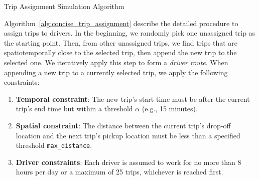 \begin{algorithm}[ht]
\caption{Trip Assignment Simulation Algorithm}
\label{alg:concise_trip_assignment}
\DontPrintSemicolon


\end{algorithm}


Algorithm~\ref{alg:concise_trip_assignment} describe the detailed procedure to assign trips to drivers. In the beginning, we randomly pick one unassigned trip as the starting point. Then, from other unassigned trips, we find trips that are spatiotemporally close to the selected trip, then append the new trip to the selected one. We iteratively apply this step to form a \emph{driver route}. When appending a new trip to a currently selected trip, we apply the following constraints:
\begin{enumerate}
    \item \textbf{Temporal constraint}: The new trip's start time must be after the current trip's end time but within a threshold $\alpha$ (e.g., 15 minutes).
    \item \textbf{Spatial constraint}: The distance between the current trip's drop-off location and the next trip's pickup location must be less than a specified threshold \texttt{max\_distance}.
    \item \textbf{Driver constraints}: Each driver is assumed to work for no more than 8 hours per day or a maximum of 25 trips, whichever is reached first.
\end{enumerate}

